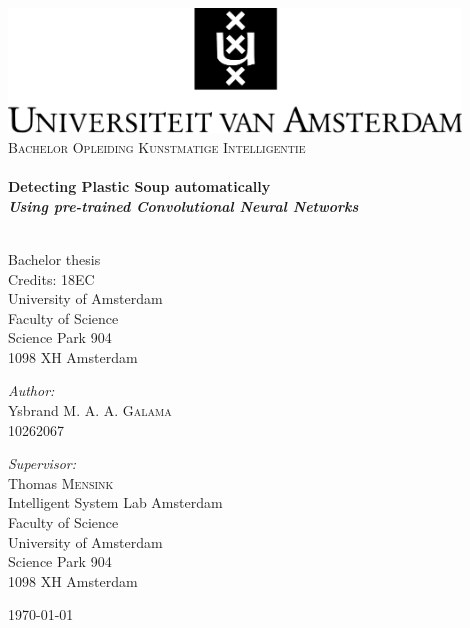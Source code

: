 \begin{titlepage}
\begin{center}
\includegraphics[width=0.9\textwidth]{images/uva-campus.pdf}\\[0.5cm]


\textsc{\large Bachelor Opleiding Kunstmatige Intelligentie}\\[1cm]

\HRule \\[0.4cm]
{\bfseries { \huge Detecting Plastic Soup automatically
} \\[0.2cm]
{\it \Large  Using pre-trained Convolutional Neural Networks}
\\[0.4cm] }

\HRule \\[1cm]

Bachelor thesis\\
Credits: 18EC\\[0.5cm]
University of Amsterdam\\
Faculty of Science\\
Science Park 904\\
1098 XH Amsterdam\\[0.5cm]

\vfill

\begin{minipage}[t]{0.4\textwidth}
\begin{flushleft}
\emph{Author:}\\
Ysbrand M. A. A. \textsc{Galama}\\
10262067
\end{flushleft}
\end{minipage}
\begin{minipage}[t]{0.4\textwidth}
\begin{flushright}
\emph{Supervisor:} \\
Thomas \textsc{Mensink}\\[0.4cm]
Intelligent System Lab Amsterdam\\
Faculty of Science\\
University of Amsterdam\\
Science Park 904\\
1098 XH Amsterdam\\
\end{flushright}
\end{minipage}

\vfill

{\large \today}

\end{center}
\end{titlepage}